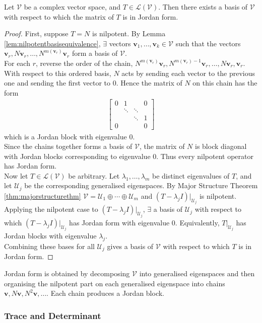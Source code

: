 \begin{theorem} Let $\mathcal{V}$ be a complex vector space, and $T \in \mathcal{L}(\mathcal{V})$. Then there exists a basis of $\mathcal{V}$ with respect to which the matrix of $T$ is in Jordan form.
\begin{proof} First, suppose $T = N$ is nilpotent. By Lemma \ref{lem:nilpotentbasisequivalence}, $\exists$ vectors $\mathbf{v}_1, \ldots, \mathbf{v}_k \in \mathcal{V}$ such that the vectors $\mathbf{v}_r, N \mathbf{v}_r, \ldots, N^{m(\mathbf{v}_r)} \mathbf{v}_r$ form a basis of $\mathcal{V}$.\\
For each $r$, reverse the order of the chain, $N^{m(\mathbf{v}_r)} \mathbf{v}_r, N^{m(\mathbf{v}_r)-1} \mathbf{v}_r, \ldots, N \mathbf{v}_r, \mathbf{v}_r$.\\
With respect to this ordered basis, $N$ acts by sending each vector to the previous one and sending the first vector to $0$. Hence the matrix of $N$ on this chain has the form
\begin{align}
\begin{bmatrix}
0 & 1 & & 0 \\
& \ddots & \ddots & \\
& & \ddots & 1 \\
0 & & & 0
\end{bmatrix} \nonumber
\end{align}
which is a Jordan block with eigenvalue $0$.\\
Since the chains together forms a basis of $\mathcal{V}$, the matrix of $N$ is block diagonal with Jordan blocks corresponding to eigenvalue $0$. Thus every nilpotent operator has Jordan form.\\
Now let $T \in \mathcal{L}(\mathcal{V})$ be arbitrary. Let $\lambda_1, \ldots, \lambda_m$ be distinct eigenvalues of $T$, and let $\mathcal{U}_j$ be the corresponding generalised eigenspaces. By Major Structure Theorem \ref{thm:majorstructurethm} $\mathcal{V} = \mathcal{U}_1 \oplus \cdots \oplus \mathcal{U}_m$ and $(T - \lambda_j I)|_{\mathcal{U}_j}$ is nilpotent.\\
Applying the nilpotent case to $(T - \lambda_j I)|_{\mathcal{U}_j}$, $\exists$ a basis of $\mathcal{U}_j$ with respect to which $(T - \lambda_j I)|_{\mathcal{U}_j}$ has Jordan form with eigenvalue $0$. Equivalently, $T|_{\mathcal{U}_j}$ has Jordan blocks with eigenvalue $\lambda_j$.\\
Combining these bases for all $\mathcal{U}_j$ gives a basis of $\mathcal{V}$ with respect to which $T$ is in Jordan form.
\end{proof}
\end{theorem}

Jordan form is obtained by decomposing $\mathcal{V}$ into generalised eigenspaces and then organising the nilpotent part on each generalised eigenspace into chains $\mathbf{v}, N \mathbf{v}, N^2 \mathbf{v}, \ldots$. Each chain produces a Jordan block.

\subsubsection{Trace and Determinant}


